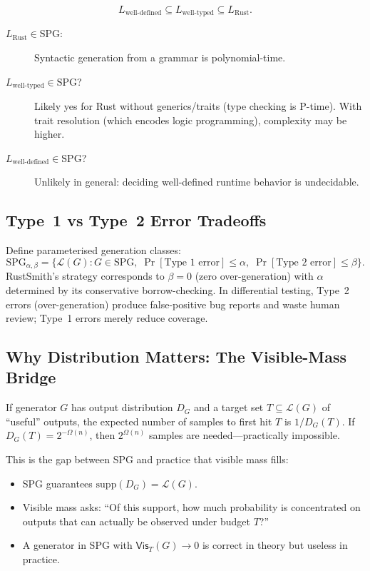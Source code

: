 \documentclass[11pt]{article}
\newcommand{\SPG}{\text{SPG}}
\theoremstyle{remark}
\theoremstyle{definition}
\begin{document}
\[
L_{\text{well-defined}} \subseteq L_{\text{well-typed}} \subseteq L_{\text{Rust}}.
\]

\begin{description}
  \item[$L_{\text{Rust}} \in \SPG$:] Syntactic generation from a grammar is
    polynomial-time.
  \item[$L_{\text{well-typed}} \in \SPG$?] Likely yes for Rust without
    generics/traits (type checking is P-time).  With trait resolution (which
    encodes logic programming), complexity may be higher.
  \item[$L_{\text{well-defined}} \in \SPG$?] Unlikely in general: deciding
    well-defined runtime behavior is undecidable.
\end{description}

\subsection{Type~1 vs Type~2 Error Tradeoffs}\label{sec:type1-type2}

Define parameterised generation classes:
\[
\SPG_{\alpha,\beta} = \{ \mathcal{L}(G) : G \in \SPG{},\;
\Pr[\text{Type~1 error}] \le \alpha,\;
\Pr[\text{Type~2 error}] \le \beta \}.
\]
RustSmith's strategy corresponds to $\beta = 0$ (zero over-generation) with
$\alpha$ determined by its conservative borrow-checking.  In differential
testing, Type~2 errors (over-generation) produce false-positive bug reports and
waste human review; Type~1 errors merely reduce coverage.


\subsection{Why Distribution Matters: The Visible-Mass Bridge}\label{sec:distribution-matters}

If generator $G$ has output distribution $D_G$ and a target set
$T \subseteq \mathcal{L}(G)$ of ``useful'' outputs, the expected number of
samples to first hit $T$ is $1/D_G(T)$.  If $D_G(T) = 2^{-\Omega(n)}$, then
$2^{\Omega(n)}$ samples are needed---practically impossible.

This is the gap between SPG and practice that visible mass fills:
\begin{itemize}
  \item SPG guarantees $\mathrm{supp}(D_G) = \mathcal{L}(G)$.
  \item Visible mass asks: ``Of this support, how much probability is
    concentrated on outputs that can actually be observed under budget $T$?''
  \item A generator in SPG with $\mathsf{Vis}_T(G) \to 0$ is correct in theory
    but useless in practice.
\end{itemize}
\end{document}
